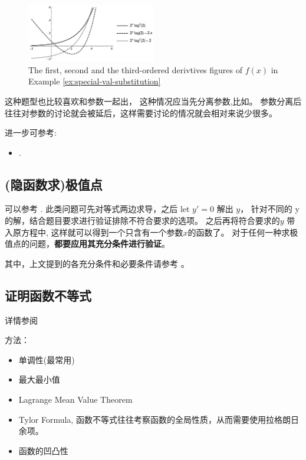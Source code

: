 \begin{figure}
    \centering
    \includegraphics[width=0.5\textwidth]{figure/3-orders-dervatives-of-2-to-x---x-to2---1.png}
    \caption{The first, second and the third-ordered derivtives figures of $f(x)$ in Example \ref{ex:special-val-substitution}}
    \label{fig:3-orders-dervatives-of-2-to-x---x-to2---1}
\end{figure}

这种题型也比较喜欢和参数一起出，
这种情况应当先分离参数,比如\cite[page 77, pdf 88, 例5]{we}。
参数分离后往往对参数的讨论就会被延后，这样需要讨论的情况就会相对来说少很多。

进一步可参考:
\begin{itemize}
    \item \cite[page 85, pdf 96, example 6]{we}.
\end{itemize}

\subsection{(隐函数求)极值点}

可以参考 \cite[page 71, pdf 82, 例2]{we}.
此类问题可先对等式两边求导，之后 let $y' = 0$ 解出 $y$，
针对不同的 y 的解，结合题目要求进行验证排除不符合要求的选项。
之后再将符合要求的$y$ 带入原方程中, 这样就可以得到一个只含有一个参数$x$的函数了。
对于任何一种求极值点的问题，\textbf{都要应用其充分条件进行验证}。

其中，上文提到的各充分条件和必要条件请参考
\cite[page 68, pdf 79]{we}。

\subsection{证明函数不等式}

详情参阅 \cite[page 79, pdf 90]{we}

方法：
\begin{itemize}
    \item 单调性(最常用)
    \item 最大最小值
    \item Lagrange Mean Value Theorem
    \item Tylor Formula, 函数不等式往往考察函数的全局性质，从而需要使用拉格朗日余项。
    \item 函数的凹凸性
\end{itemize}

